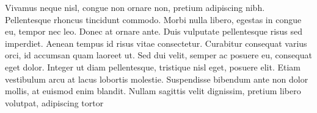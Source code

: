 \documentclass[a4paper, 10pt, twoside]{article}
\begin{document}
Vivamus neque nisl, congue non ornare non, pretium adipiscing nibh. Pellentesque rhoncus tincidunt commodo. Morbi nulla libero, egestas in congue eu, tempor nec leo. Donec at ornare ante. Duis vulputate pellentesque risus sed imperdiet. Aenean tempus id risus vitae consectetur. Curabitur consequat varius orci, id accumsan quam laoreet ut. Sed dui velit, semper ac posuere eu, consequat eget dolor. Integer ut diam pellentesque, tristique nisl eget, posuere elit. Etiam vestibulum arcu at lacus lobortis molestie. Suspendisse bibendum ante non dolor mollis, at euismod enim blandit. Nullam sagittis velit dignissim, pretium libero volutpat, adipiscing tortor
\end{document}
